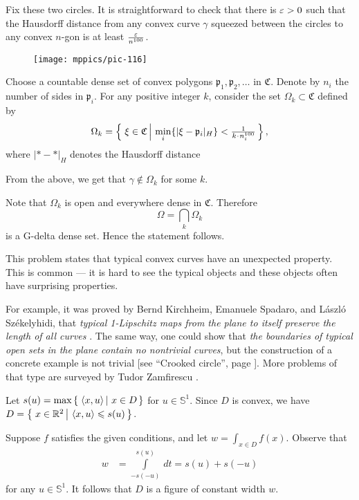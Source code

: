 Fix these two circles.
It is straightforward to check that there is $\varepsilon>0$ such that 
the Hausdorff distance from any convex curve $\gamma$ squeezed between the circles 
to any convex $n$-gon is at least $\frac{\varepsilon}{n^{100}}$.

\begin{wrapfigure}{o}{41 mm}
\vskip-0mm
\centering
\texttt{[image: mppics/pic-116]}
\end{wrapfigure}

Choose a countable dense set of convex polygons $\mathfrak{p}_1,\mathfrak{p}_2,\dots$ in $\mathfrak{C}$.
Denote by $n_i$ the number of sides in $\mathfrak{p}_i$.
For any positive integer $k$,
consider the set $\Omega_k\subset\mathfrak{C}$ defined by 
\[\Omega_k
=
\set{\xi\in \mathfrak{C}}{\min_i\{|\xi-\mathfrak{p}_i|_{H}\}<\tfrac1{k\cdot n_i^{100}}},\]
where $|{*}-{*}|_H$ denotes the Hausdorff distance 

From the above, we get that $\gamma\notin\Omega_k$ for some $k$. 

Note that $\Omega_k$ is open and everywhere dense in $\mathfrak{C}$.
Therefore 
\[\Omega=\bigcap_k\Omega_k\]
is a G-delta dense set.
Hence the statement follows.\qeds

This problem states that typical convex curves have an unexpected property.
This is common --- it is hard to see the typical objects and these objects often have surprising properties.

For example, it was proved by
Bernd Kirchheim, 
Emanuele Spadaro, 
and 
L{\'a}szl{\'o} Sz{\'e}kelyhidi,
that \textit{typical 1-Lipschitz maps from the plane to itself preserve the length of all curves} \cite{KSS}.
The same way, one could show that \textit{the boundaries of typical open sets in the plane contain no nontrivial curves}, 
but the construction of a concrete example is not trivial
[see ``Crooked circle'', page \pageref{Crooked circle}].
More problems of that type are surveyed by Tudor Zamfirescu \cite{zamfirescu}.

Let $s(u) = \max\set{\langle x, u \rangle}{x \in D}$
for $u \in \mathbb{S}^1$.
Since $D$ is convex, we have $D = \set{x \in \mathbb{R}^2}{\langle x, u \rangle \le s(u)}$.

Suppose $f$ satisfies the given conditions, and let $w = \int_{x \in D} f(x)$.
Observe that
\begin{align*}
w
&= \int\limits_{-s(-u)}^{s(u)} \, dt = s(u) + s(-u)
\end{align*}
for any $u \in \mathbb{S}^1$.
It follows that $D$ is a figure of constant width $w$.

